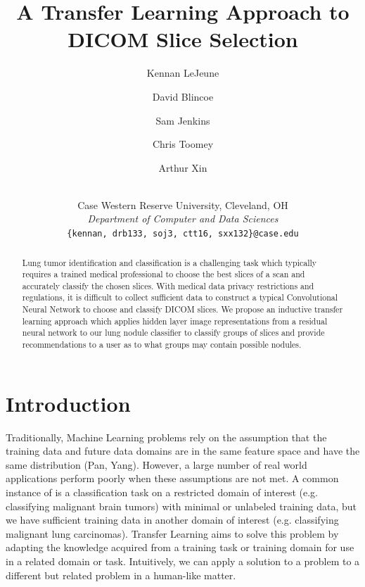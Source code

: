 \documentclass[10pt,twocolumn,letterpaper]{article}
\begin{document}
\title{A Transfer Learning Approach to DICOM Slice Selection}

\author{Kennan LeJeune\\
   \and
   David Blincoe\\
   \and
   Sam Jenkins\\
   \and
   Chris Toomey\\
   \and
   Arthur Xin\\
   \and
   \\
   {Case Western Reserve University, Cleveland, OH}\\
   {\textit{Department of Computer and Data Sciences}}\\
   {\tt\small \{kennan, drb133, soj3, ctt16, sxx132\}@case.edu}
}
\maketitle

\begin{abstract}
   Lung tumor identification and classification is a challenging task which typically requires a trained medical
   professional to choose the best slices of a scan and accurately classify the chosen slices. With medical data privacy restrictions
   and regulations, it is difficult to collect sufficient data to construct a typical Convolutional Neural Network to
   choose and classify DICOM slices. We propose an inductive transfer learning approach which applies hidden layer
   image representations from a residual neural network to our lung nodule classifier to classify groups of slices and provide
   recommendations to a user as to what groups may contain possible nodules.
\end{abstract}

\section{Introduction} \label{sec:intro}

   Traditionally, Machine Learning problems rely on the assumption that the training data and future data domains
   are in the same feature space and have the same distribution (Pan, Yang). However, a large number of real world
   applications perform poorly when these assumptions are not met. A common instance of is a classification task on
   a restricted domain of interest (e.g. classifying malignant brain tumors) with minimal or unlabeled training data,
   but we have sufficient training data in another domain of interest (e.g. classifying malignant lung carcinomas).
   Transfer Learning aims to solve this problem by adapting the knowledge acquired from a training task or
   training domain for use in a related domain or task. Intuitively, we can apply a solution to a problem to a
   different but related problem in a human-like matter.
\end{document}
